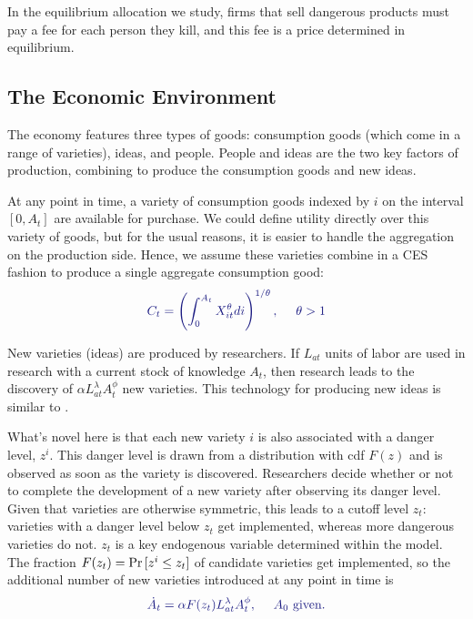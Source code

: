 \documentclass[12pt,twoside]{article}
\newcommand{\cn}[1]{\citet*{#1}}
\newcommand{\Prob}[1]{\mbox{\textnormal{Pr}} \, [#1] }
\newcommand{\clr}[1]{{\color{ChadBlue} #1}}
\begin{document}
In the equilibrium allocation we study, firms that sell dangerous
products must pay a fee for each person they kill, and this fee is a
price determined in equilibrium.




\subsection{The Economic Environment}

The economy features three types of goods: consumption goods (which come
in a range of varieties), ideas, and people. People and ideas are the
two key factors of production, combining to produce the consumption
goods and new ideas.

At any point in time, a variety of consumption goods indexed by $i$ on
the interval $[0,A_t]$ are available for purchase.  We could define
utility directly over this variety of goods, but for the usual reasons,
it is easier to handle the aggregation on the production side.  Hence,
we assume these varieties combine in a CES fashion to produce a single
aggregate consumption good:
\begin{equation}
\label{eq:C}
\clr{ C_t = \left(\int_0 ^{A_t} X_{it} ^\theta di \right)^{1/\theta},
  \ \ \ \ \theta>1 }
\end{equation}

New varieties (ideas) are produced by researchers. If $L_{at}$ units of
labor are used in research with a current stock of knowledge $A_t$, then
research leads to the discovery of $\alpha L_{at} ^\lambda A_t ^\phi$
new varieties. This technology for producing new ideas is similar to
\cn{JonesRND}.

What's novel here is that each new variety $i$ is also associated with a
danger level, $z^i$. This danger level is drawn from a distribution with
cdf $F(z)$ and is observed as soon as the variety is discovered.
Researchers decide whether or not to complete the development of a new
variety after observing its danger level. Given that varieties are
otherwise symmetric, this leads to a cutoff level $z_t$: varieties with
a danger level below $z_t$ get implemented, whereas more dangerous
varieties do not. $z_t$ is a key endogenous variable determined within
the model. The fraction $F(z_t)=\Prob{z^i \leq z_t}$ of candidate
varieties get implemented, so the additional number of new varieties
introduced at any point in time is
\begin{equation}
\label{eq:Adot}
\clr{ \dot{A}_t = \alpha F(z_t) L_{at} ^\lambda A_t ^\phi, \ \ \ \ A_0 \mbox{ given}.}
\end{equation}
\end{document}
